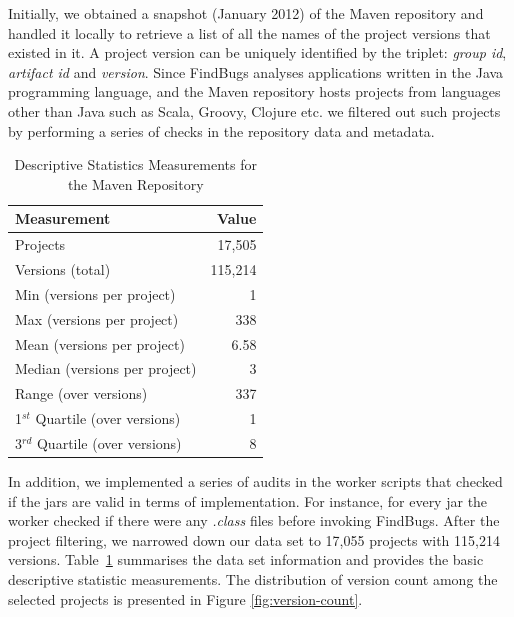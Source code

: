 \documentclass[conference]{llncs}
\begin{document}
Initially, we obtained a snapshot (January 2012) of the Maven repository and
handled it locally to retrieve a list of all the names of the project versions
that existed in it. A project version can be uniquely identified by the triplet:
{\it group id}, {\it artifact id} and {\it version}.
Since FindBugs analyses applications written in the Java
programming language, and the Maven repository
hosts projects from languages other than Java such as Scala, Groovy,
Clojure etc. we filtered out such projects by performing a series of checks in
the repository data and metadata.

\begin{table}[t]
\centering
\caption{Descriptive Statistics Measurements for the Maven Repository}
\label{tbl:repository}
\begin{tabular}{l r}
\hline
Measurement & Value\\
 \hline
Projects & 17,505\\
Versions (total) & 115,214\\
Min (versions per project) & 1\\
Max (versions per project) & 338\\
Mean (versions per project) & 6.58\\
Median (versions per project) & 3\\
Range (over versions) & 337\\
1$^{st}$ Quartile (over versions) & 1\\
3$^{rd}$ Quartile (over versions) & 8\\
\hline
\end{tabular}
\end{table}

In addition, we implemented a series of audits in the worker scripts that
checked if the {\sc jar}s are valid in terms of implementation. For instance,
for every {\sc jar} the worker checked if there were any {\it .class} files
before invoking FindBugs. After the project filtering, we narrowed down
our data set to 17,055 projects with 115,214 versions.
Table~\ref{tbl:repository} summarises the data set information and
provides the basic descriptive statistic measurements. The distribution of version
count among the selected projects is presented in Figure \ref{fig:version-count}.
\end{document}
